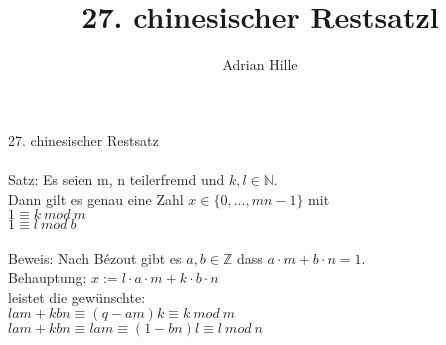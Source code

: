 \documentclass{scrartcl}
\title{27. chinesischer Restsatzl}
\author{Adrian Hille}
\begin{document}
\Large 27. chinesischer Restsatz\\
\\
\normalsize
Satz: Es seien m, n teilerfremd und $k, l \in \mathbb{N}$. \\
Dann gilt es genau eine Zahl $x \in \{0, ..., mn-1 \}$ mit\\
$1 \equiv k~mod~m$\\
$1 \equiv l~mod~b$\\
\\
Beweis: Nach B\'ezout gibt es $a, b \in \mathbb{Z}$ dass $a \cdot m + b \cdot n = 1$.\\
Behauptung: $x := l \cdot a \cdot m + k \cdot b \cdot n$\\
leistet die gew\"unschte:\\
$lam+kbn \equiv (q-am)k \equiv k~mod~m$\\
$lam+kbn \equiv lam \equiv (1 - bn)l \equiv l~mod~n$\\
\end{document}
